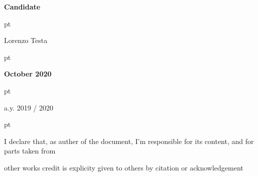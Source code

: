 \centerline {\textbf{Candidate}}

 pt

\centerline {Lorenzo Testa}

 pt

\centerline{\bf October 2020}

 pt

\centerline{a.y.  2019 / 2020}

 pt

\centerline{\footnotesize I declare that, as auther of the document, I'm responsible for its content, and for parts taken from}
\centerline{\footnotesize other works credit is explicity given to others by citation or acknowledgement}

\restoregeometry